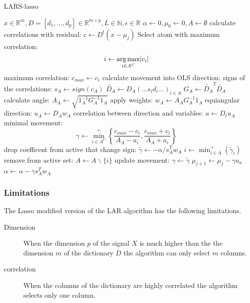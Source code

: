 \begin{algorithm}
\caption{LARS-lasso}
\begin{algorithmic}[1]
\REQUIRE $x \in \mathbb{R}^m, D =[d_1,...,d_p] \in \mathbb{R}^{m\times p}, L \in \mathbb{N}, \epsilon \in \mathbb{R}$
\STATE $\alpha \gets 0, \mu_{0} \gets 0, A \gets \emptyset$
\STATE calculate correlations with residual: $c \gets D^t\left( x-\mu_j \right) $
\STATE Select atom with maximum correlation: 
\begin{equation*}
i \gets \argmax_{i \in A^C} \lvert c_i  \rvert %
\end{equation*}
\STATE maximum correlation: $c_{max} \gets c_i $ %
\STATE calculate movement into OLS direction:
\STATE signs of the correlations: $s_A \gets  sign\left(c_A\right)$
\STATE $\tilde{D_A} \gets D_A\left(\ldots s_id_i \ldots\right)_{i\in A}$
\STATE $G_A \gets \tilde{D_A}^T\tilde{D_A}$
\STATE calculate angle: $A_A \gets \sqrt{ 1_A^{-1} G_A^{-1} 1_A
}$
\STATE apply weights: $w_A \gets A_AG_A^{-1}1_A$
\STATE equiangular direction: $u_A \gets D_Aw_A$
\STATE correlation between direction and variables: $a \gets D_tu_A$
\STATE minimal movement:
\begin{equation*}
\gamma \gets \min_{i\in A^C}^{+} \left\lbrace \frac{c_{max}-c_i }{A_A-a_i }, \frac{c_{max}+c_i }{A_A+a_i } \right\rbrace
\end{equation*}
\STATE drop coefficent from active that change sign: 
\STATE $ \tilde{\gamma} \gets -\alpha/s_A^Tw_A  $
\STATE $ i \gets \min_{i\in A}^{+} \left( \tilde{\gamma}_i \right) $
\STATE remove from active set: $ A \gets A \backslash \{i\} $
\STATE update movement: $ \gamma \gets \tilde{\gamma} $  
\ENDIF
\STATE $ \mu_{j+1} \gets \mu_{j} - \gamma u_a $
\STATE $ \alpha \gets \alpha - \gamma s_A^Tw_A $

\ENDFOR

\end{algorithmic}
\end{algorithm}

\subsubsection*{Limitations}
The Lasso modified version of the LAR algorithm has the following limitations.
\begin{description}
 \item[Dimension] When the dimension $p$ of the signal $X$ is much higher than
the the dimension $m$ of the dictionary $D$ the algorithm can only select $m$
columns.
  \item[correlation] When the columns of the dictionary are highly correlated
the algorithm selects only one column.
\end{description}

